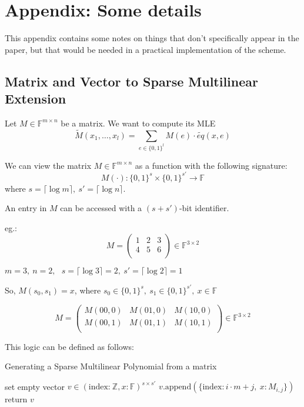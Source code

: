 \documentclass{article}
\theoremstyle{definition}
\begin{document}
\appendix
\section{Appendix: Some details}
This appendix contains some notes on things that don't specifically appear in the paper, but that would be needed in a practical implementation of the scheme.

\subsection{Matrix and Vector to Sparse Multilinear Extension}

Let $M \in \mathbb{F}^{m \times n}$ be a matrix. We want to compute its MLE
$$\widetilde{M}(x_1, \ldots, x_l) = \sum_{e \in \{0, 1 \}^l} M(e) \cdot \widetilde{eq}(x, e)$$

We can view the matrix $M \in \mathbb{F}^{m \times n}$ as a function with the following signature:
$$M(\cdot): \{0,1\}^s \times \{0,1\}^{s'} \rightarrow \mathbb{F}$$
where $s = \lceil \log m \rceil,~ s' = \lceil \log n \rceil$.

An entry in $M$ can be accessed with a $(s+s')$-bit identifier.

eg.:
$$
M = \begin{pmatrix}
1 & 2 & 3\\
4 & 5 & 6\\
\end{pmatrix}
\in \mathbb{F}^{3 \times 2}
$$

$m = 3,~ n = 2,~~~ s = \lceil \log 3 \rceil = 2,~ s' = \lceil \log 2 \rceil = 1$

So, $M(s_0, s_1) = x$, where $s_0 \in \{0,1\}^s,~ s_1 \in \{0,1\}^{s'},~ x \in \mathbb{F}$

$$
M = \begin{pmatrix}
M(00,0) & M(01,0) & M(10,0)\\
M(00,1) & M(01,1) & M(10,1)\\
\end{pmatrix}
\in \mathbb{F}^{3 \times 2}
$$

This logic can be defined as follows:

\begin{algorithm}[H]
\caption{Generating a Sparse Multilinear Polynomial from a matrix}
\begin{algorithmic}
	\State set empty vector $v \in (\text{index:}~ \mathbb{Z}, x: \mathbb{F})^{s \times s'}$
			\State $v.\text{append}( \{ \text{index}: i \cdot m + j,~ x: M_{i,j} \} )$
		\EndIf
	\EndFor
	\EndFor
	\State return $v$    
\end{algorithmic}
\end{algorithm}
\end{document}
